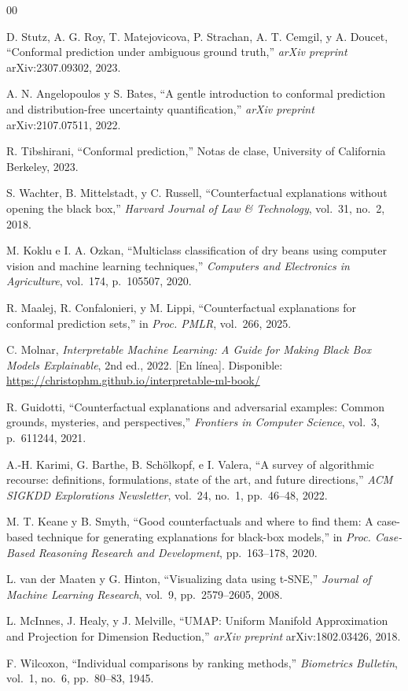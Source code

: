 \documentclass[conference]{IEEEtran}
\begin{document}
\begin{thebibliography}{00}

 D. Stutz, A. G. Roy, T. Matejovicova, P. Strachan,
A. T. Cemgil, y A. Doucet, ``Conformal prediction under ambiguous
ground truth,'' \textit{arXiv preprint} arXiv:2307.09302, 2023.

 A. N. Angelopoulos y S. Bates, ``A gentle introduction to
conformal prediction and distribution-free uncertainty quantification,''
\textit{arXiv preprint} arXiv:2107.07511, 2022.

 R. Tibshirani, ``Conformal prediction,'' Notas de clase,
University of California Berkeley, 2023.

 S. Wachter, B. Mittelstadt, y C. Russell,
``Counterfactual explanations without opening the black box,''
\textit{Harvard Journal of Law \& Technology}, vol.~31, no.~2, 2018.

 M. Koklu e I. A. Ozkan, ``Multiclass classification of
dry beans using computer vision and machine learning techniques,''
\textit{Computers and Electronics in Agriculture}, vol.~174,
p.~105507, 2020.

 R. Maalej, R. Confalonieri, y M. Lippi,
``Counterfactual explanations for conformal prediction sets,''
in \textit{Proc. PMLR}, vol.~266, 2025.

 C. Molnar, \textit{Interpretable Machine Learning: A Guide
for Making Black Box Models Explainable}, 2nd ed., 2022. [En línea].
Disponible: \url{https://christophm.github.io/interpretable-ml-book/}

 R. Guidotti, ``Counterfactual explanations and adversarial
examples: Common grounds, mysteries, and perspectives,''
\textit{Frontiers in Computer Science}, vol.~3, p.~611244, 2021.

 A.-H. Karimi, G. Barthe, B. Schölkopf, e I. Valera,
``A survey of algorithmic recourse: definitions, formulations, state of
the art, and future directions,'' \textit{ACM SIGKDD Explorations
Newsletter}, vol.~24, no.~1, pp.~46--48, 2022.

 M. T. Keane y B. Smyth, ``Good counterfactuals and where
to find them: A case-based technique for generating explanations for
black-box models,'' in \textit{Proc. Case-Based Reasoning Research and
Development}, pp.~163--178, 2020.

 L. van der Maaten y G. Hinton, ``Visualizing data using
t-SNE,'' \textit{Journal of Machine Learning Research}, vol.~9,
pp.~2579--2605, 2008.

 L. McInnes, J. Healy, y J. Melville, ``UMAP: Uniform
Manifold Approximation and Projection for Dimension Reduction,''
\textit{arXiv preprint} arXiv:1802.03426, 2018.

 F. Wilcoxon, ``Individual comparisons by ranking methods,''
\textit{Biometrics Bulletin}, vol.~1, no.~6, pp.~80--83, 1945.

\end{thebibliography}
\end{document}
